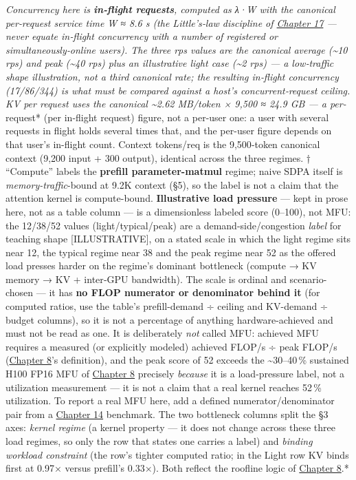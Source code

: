 \emph{Concurrency here is \textbf{in‑flight requests}, computed as λ·W
with the canonical per‑request service time W ≈ 8.6 s (the Little's‑law
discipline of \hyperref[chap:17]{Chapter 17} --- never equate in‑flight concurrency with a
number of registered or simultaneously‑online users). The three rps
values are the canonical average (\textasciitilde10 rps) and peak
(\textasciitilde40 rps) plus an illustrative light case
(\textasciitilde2 rps) --- a low‑traffic shape illustration, not a third
canonical rate; the resulting in‑flight concurrency (17/86/344) is what
must be compared against a host's concurrent‑request ceiling. KV per
request uses the canonical \textasciitilde2.62 MB/token × 9,500 ≈ 24.9
GB --- a per-}request* (per in-flight request) figure, not a per-user
one: a user with several requests in flight holds several times that,
and the per-user figure depends on that user's in-flight count. Context
tokens/req is the 9,500‑token canonical context (9,200 input + 300
output), identical across the three regimes. † ``Compute'' labels the
\textbf{prefill parameter-matmul} regime; naive SDPA itself is
\emph{memory-traffic}-bound at 9.2K context (§5), so the label is not a
claim that the attention kernel is compute-bound. \textbf{Illustrative
load pressure} --- kept in prose here, not as a table column --- is a
dimensionless labeled score (0--100), not MFU: the 12/38/52 values
(light/typical/peak) are a demand-side/congestion \emph{label} for
teaching shape \mbox{{[}ILLUSTRATIVE{]}}, on a stated scale in which the light
regime sits near 12, the typical regime near 38 and the peak regime near
52 as the offered load presses harder on the regime's dominant
bottleneck (compute → KV memory → KV + inter‑GPU bandwidth). The scale
is ordinal and scenario-chosen --- it has \textbf{no FLOP numerator or
denominator behind it} (for computed ratios, use the table's
prefill-demand ÷ ceiling and KV-demand ÷ budget columns), so it is not a
percentage of anything hardware-achieved and must not be read as one. It
is deliberately \emph{not} called MFU: achieved MFU requires a measured
(or explicitly modeled) achieved FLOP/s ÷ peak FLOP/s (\hyperref[chap:8]{Chapter 8}'s
definition), and the peak score of 52 exceeds the
\textasciitilde30--40\,\% sustained H100 FP16 MFU of \hyperref[chap:8]{Chapter 8} precisely
\emph{because} it is a load-pressure label, not a utilization
measurement --- it is not a claim that a real kernel reaches 52\,\%
utilization. To report a real MFU here, add a defined
numerator/denominator pair from a \hyperref[chap:14]{Chapter 14} benchmark. The two
bottleneck columns split the §3 axes: \emph{kernel regime} (a kernel
property --- it does not change across these three load regimes, so only
the row that states one carries a label) and \emph{binding workload
constraint} (the row's tighter computed ratio; in the Light row KV binds
first at 0.97× versus prefill's 0.33×). Both reflect the roofline logic
of \hyperref[chap:8]{Chapter 8}.*
